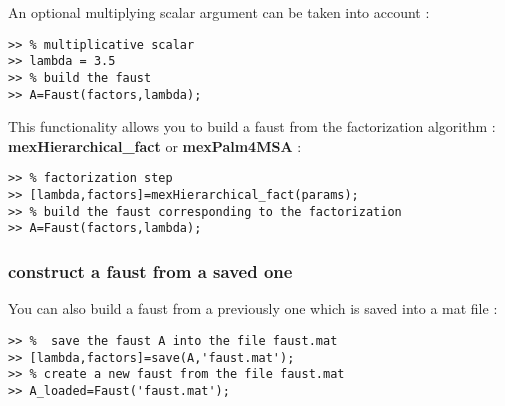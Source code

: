 An optional multiplying scalar argument can be taken into account  :
\begin{lstlisting}
>> % multiplicative scalar
>> lambda = 3.5 
>> % build the faust
>> A=Faust(factors,lambda);
\end{lstlisting}

This functionality allows you to build a faust from the factorization algorithm :
\textbf{mexHierarchical{\_}fact} or \textbf{mexPalm4MSA} :
\begin{lstlisting}
>> % factorization step
>> [lambda,factors]=mexHierarchical_fact(params);
>> % build the faust corresponding to the factorization
>> A=Faust(factors,lambda);
\end{lstlisting}

\subsubsection{construct a faust from a saved one}\label{sec:firstUseBuildFromSave}

You can also build a faust from a previously one which is saved into a mat file :
\begin{lstlisting}
>> %  save the faust A into the file faust.mat
>> [lambda,factors]=save(A,'faust.mat');
>> % create a new faust from the file faust.mat
>> A_loaded=Faust('faust.mat');
\end{lstlisting}
 